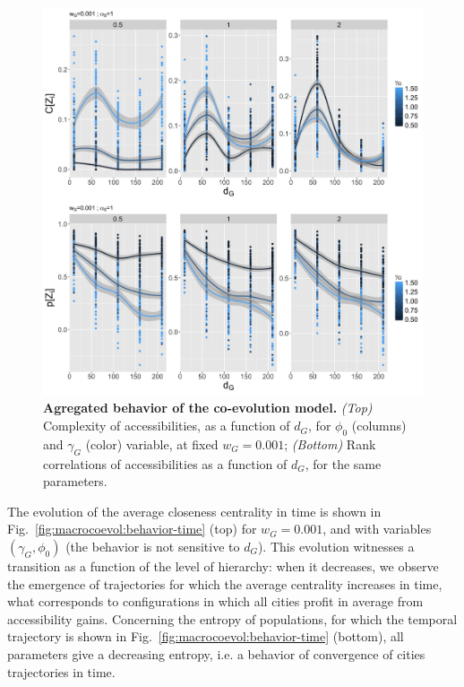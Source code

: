 \begin{figure}
\includegraphics[width=\linewidth]{figures/6-2-2-fig-macrocoevol-behavior-aggreg.jpg}
\caption{\textbf{Agregated behavior of the co-evolution model.} \textit{(Top)} Complexity of accessibilities, as a function of $d_G$, for $\phi_0$ (columns) and $\gamma_G$ (color) variable, at fixed $w_G = 0.001$; \textit{(Bottom)} Rank correlations of accessibilities as a function of $d_G$, for the same parameters.\label{fig:macrocoevol:behavior-aggreg}}
\end{figure}


The evolution of the average closeness centrality in time is shown in Fig.~\ref{fig:macrocoevol:behavior-time} (top) for $w_G = 0.001$, and with variables $(\gamma_G,\phi_0)$ (the behavior is not sensitive to $d_G$). This evolution witnesses a transition as a function of the level of hierarchy: when it decreases, we observe the emergence of trajectories for which the average centrality increases in time, what corresponds to configurations in which all cities profit in average from accessibility gains. Concerning the entropy of populations, for which the temporal trajectory is shown in Fig.~\ref{fig:macrocoevol:behavior-time} (bottom), all parameters give a decreasing entropy, i.e. a behavior of convergence of cities trajectories in time.


